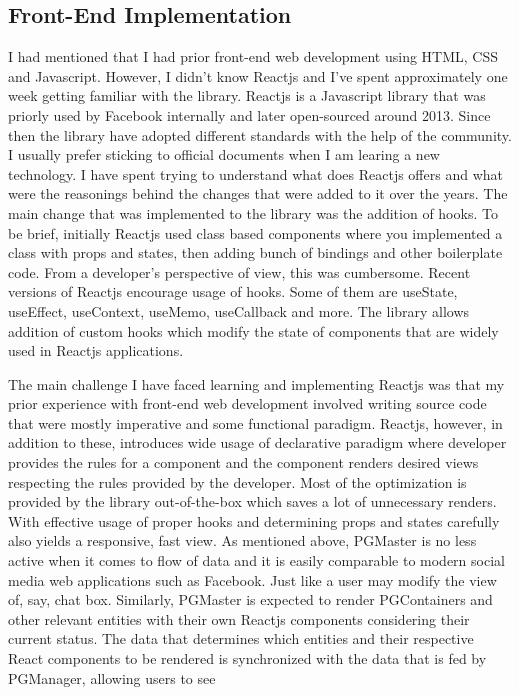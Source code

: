 \subsection{Front-End Implementation}
I had mentioned that I had prior front-end web development using HTML, CSS and 
Javascript. However, I didn't know Reactjs and I've spent approximately one 
week getting familiar with the library. Reactjs is a Javascript library 
that was priorly used by Facebook internally and later open-sourced around 
2013. Since then the library have adopted different standards with the help 
of the community. I usually prefer sticking to official documents when I 
am learing a new technology. I have spent trying to understand what does 
Reactjs offers and what were the reasonings behind the changes that were 
added to it over the years. The main change that was implemented to the 
library was the addition of hooks. To be brief, initially Reactjs used 
class based components where you implemented a class with props and states, 
then adding bunch of bindings and other boilerplate code. From a developer's 
perspective of view, this was cumbersome. Recent versions of Reactjs 
encourage usage of hooks. Some of them are useState, useEffect, useContext,
useMemo, useCallback and more. The library allows addition of custom hooks 
which modify the state of components that are widely used in Reactjs 
applications.
\par
The main challenge I have faced learning and implementing Reactjs was that 
my prior experience with front-end web development involved writing source 
code that were mostly imperative and some functional paradigm. Reactjs, 
however, in addition to these, introduces wide usage of declarative paradigm 
where developer provides the rules for a component and the component renders 
desired views respecting the rules provided by the developer. Most of the 
optimization is provided by the library out-of-the-box which saves a lot of 
unnecessary renders. With effective usage of proper hooks and determining 
props and states carefully also yields a responsive, fast view. As mentioned 
above, PGMaster is no less active when it comes to flow of data and it is 
easily comparable to modern social media web applications such as Facebook. 
Just like a user may modify the view of, say, chat box. Similarly, PGMaster 
is expected to render PGContainers and other relevant entities with their own 
Reactjs components considering their current status. The data that determines 
which entities and their respective React components to be rendered is 
synchronized with the data that is fed by PGManager, allowing users to see 
